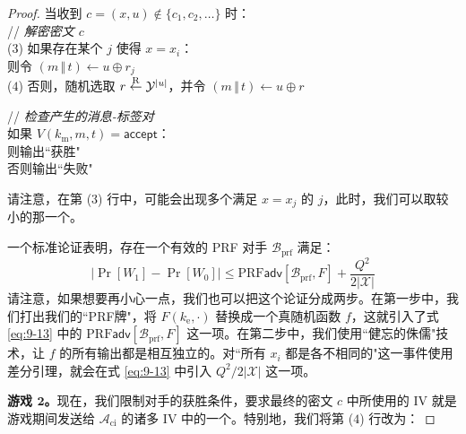\begin{proof}
\vspace*{5pt}

\hspace*{5pt} 当收到 $c=(x,u)\notin\{c_1,c_2,\dots\}$ 时：\\
\hspace*{50pt} // \quad \emph{解密密文 $c$}\\
\hspace*{7pt} ($3$)
\hspace*{22.5pt} 如果存在某个 $j$ 使得 $x=x_i$：\\
\hspace*{75pt} 则令 $(m\,\Vert\,t)\leftarrow u\oplus r_j$\\
\hspace*{7pt} ($4$)
\hspace*{47.2pt} 否则，随机选取 $r\overset{\rm R}\leftarrow\mathcal{Y}^{|u|}$，并令 $(m\,\Vert\,t)\leftarrow u\oplus r$

\vspace*{5pt}

\hspace*{29pt} // \quad \emph{检查产生的消息-标签对}\\
\hspace*{50pt} 如果 $V(k_\mathrm{m},m,t)=\mathsf{accept}$：\\
\hspace*{75pt} 则输出``获胜"\\
\hspace*{75pt} 否则输出``失败"

\vspace*{10pt}

请注意，在第 ($3$) 行中，可能会出现多个满足 $x=x_j$ 的 $j$，此时，我们可以取较小的那一个。

一个标准论证表明，存在一个有效的 PRF 对手 $\mathcal{B}_\mathrm{prf}$ 满足：
\begin{equation}\label{eq:9-13}
\big\lvert
\Pr[W_1]-\Pr[W_0]
\big\rvert
\leq
\mathrm{PRF}\mathsf{adv}[\mathcal{B}_\mathrm{prf},F]+\frac{Q^2}{2|\mathcal{X}|}
\end{equation}
请注意，如果想要再小心一点，我们也可以把这个论证分成两步。在第一步中，我们打出我们的``PRF牌"，将 $F(k_\mathrm{e},\cdot)$ 替换成一个真随机函数 $f$，这就引入了式 \ref{eq:9-13} 中的 $\mathrm{PRF}\mathsf{adv}[\mathcal{B}_\mathrm{prf},F]$ 这一项。在第二步中，我们使用``健忘的侏儒"技术，让 $f$ 的所有输出都是相互独立的。对``所有 $x_i$ 都是各不相同的"这一事件使用差分引理，就会在式 \ref{eq:9-13} 中引入 ${Q^2}/{2|\mathcal{X}|}$ 这一项。

\vspace*{5pt}
\noindent\textbf{游戏 $\mathbf{2}$。}现在，我们限制对手的获胜条件，要求最终的密文 $c$ 中所使用的 IV 就是游戏期间发送给 $\mathcal{A}_\mathrm{ci}$ 的诸多 IV 中的一个。特别地，我们将第 ($4$) 行改为：


\end{proof}
